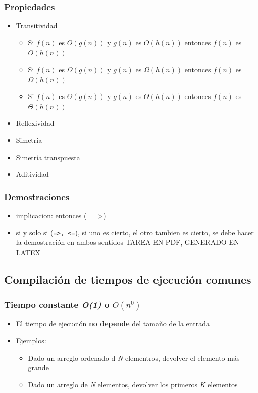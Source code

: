 \documentclass[letterpaper, 12pt]{article}
\begin{document}
\subsubsection{Propiedades}
\label{sec:org4211e98}
\begin{itemize}
\item Transitividad
\begin{itemize}
\item Si \(f(n)\) es \(O(g(n))\) y \(g(n)\) es \(O(h(n))\) entonces \(f(n)\) es \(O(h(n))\)
\item Si \(f(n)\) es \(\Omega(g(n))\) y \(g(n)\) es \(\Omega(h(n))\) entonces \(f(n)\) es
\(\Omega(h(n))\)
\item Si \(f(n)\) es \(\Theta(g(n))\) y \(g(n)\) es \(\Theta(h(n))\) entonces \(f(n)\) es
\(\Theta(h(n))\)
\end{itemize}
\item Reflexividad
\item Simetría
\item Simetría transpuesta
\item Aditividad
\end{itemize}

\subsubsection{Demostraciones}
\label{sec:org5d2b0c2}
\begin{itemize}
\item implicacion: entonces (==>)
\item si y solo si (\texttt{=>, <=}), si uno es cierto, el otro tambien es cierto, se debe
hacer la demostración en ambos sentidos
TAREA EN PDF, GENERADO EN LATEX
\end{itemize}
\subsection{Compilación de tiempos de ejecución comunes}
\label{sec:org6d5e258}
\subsubsection{Tiempo constante \emph{O(1)} o \(O(n^0)\)}
\label{sec:org777ad5a}
\begin{itemize}
\item El tiempo de ejecución \textbf{no depende} del tamaño de la entrada
\item Ejemplos:
\begin{itemize}
\item Dado un arreglo ordenado d \emph{N} elementros, devolver el elemento más grande
\item Dado un arreglo de \emph{N} elementos, devolver los primeros \emph{K} elementos
\end{itemize}
\end{itemize}
\end{document}
